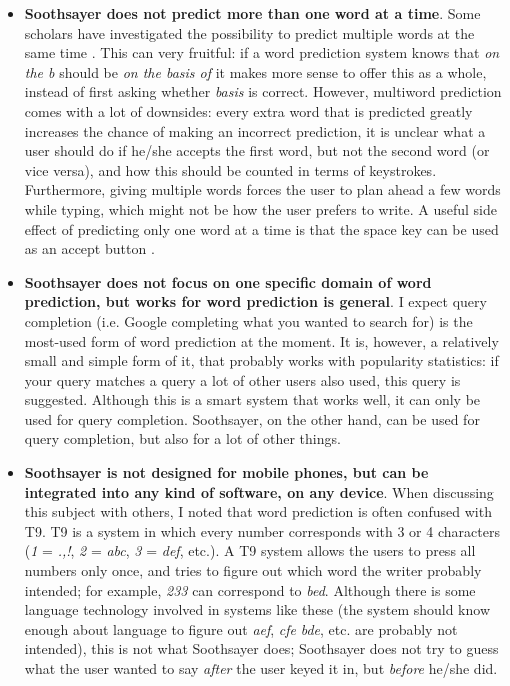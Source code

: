 \documentclass[12pt]{article}
\begin{document}
\begin{itemize}
\item \textbf{Soothsayer does not predict more than one word at a time}. Some scholars have investigated the possibility to predict multiple words at the same time . This can very fruitful: if a word prediction system knows that \emph{on the b} should be \emph{on the basis of} it makes more sense to offer this as a whole, instead of first asking whether \emph{basis} is correct. However, multiword prediction comes with a lot of downsides: every extra word that is predicted greatly increases the chance of making an incorrect prediction, it is unclear what a user should do if he/she accepts the first word, but not the second word (or vice versa), and how this should be counted in terms of keystrokes. Furthermore, giving multiple words forces the user to plan ahead a few words while typing, which might not be how the user prefers to write. A useful side effect of predicting only one word at a time is that the space key can be used as an accept button \cite{Garay-Vitoria+06}.

\item \textbf{Soothsayer does not focus on one specific domain of word prediction, but works for word prediction is general}. I expect query completion (i.e. Google completing what you wanted to search for) is the most-used form of word prediction at the moment. It is, however, a relatively small and simple form of it, that probably works with popularity statistics: if your query matches a query a lot of other users also used, this query is suggested. Although this is a smart system that works well, it can only be used for query completion. Soothsayer, on the other hand, can be used for query completion, but also for a lot of other things.

\item \textbf{Soothsayer is not designed for mobile phones, but can be integrated into any kind of software, on any device}. When discussing this subject with others, I noted that word prediction is often confused with T9. T9 is a system in which every number corresponds with 3 or 4 characters (\emph{1} = \emph{.,!}, \emph{2} = \emph{abc}, \emph{3} = \emph{def}, etc.). A T9 system allows the users to press all numbers only once, and tries to figure out which word the writer probably intended; for example, \emph{233} can correspond to \emph{bed}. Although there is some language technology involved in systems like these (the system should know enough about language to figure out \emph{aef}, \emph{cfe} \emph{bde}, etc. are probably not intended), this is not what Soothsayer does; Soothsayer does not try to guess what the user wanted to say \emph{after} the user keyed it in, but \emph{before} he/she did. 


\end{itemize}
\end{document}
